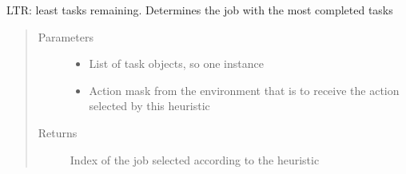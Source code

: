\documentclass[letterpaper,10pt,english]{sphinxmanual}
\begin{document}
\begin{fulllineitems}
\label{\detokenize{agents.heuristic:agents.heuristic.heuristic_agent.ltr}}
\sphinxAtStartPar
LTR: least tasks remaining. Determines the job with the most completed tasks
\begin{quote}\begin{description}
\item[{Parameters}] \leavevmode\begin{itemize}
\item {} 
\sphinxAtStartPar
{} \textendash{} List of task objects, so one instance

\item {} 
\sphinxAtStartPar
{} \textendash{} Action mask from the environment that is to receive the action selected by this heuristic

\end{itemize}

\item[{Returns}] \leavevmode
\sphinxAtStartPar
Index of the job selected according to the heuristic

\end{description}\end{quote}

\end{fulllineitems}

\end{document}
